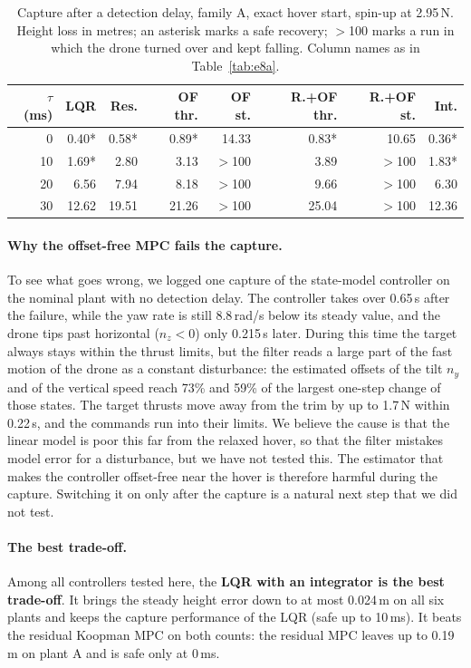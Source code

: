 \begin{table}[H]
\centering\footnotesize
\caption{Capture after a detection delay, family A, exact hover start, spin-up at 2.95\,N. Height loss in metres; an asterisk marks a safe recovery; $>$100 marks a run in which the drone turned over and kept falling. Column names as in Table~\ref{tab:e8a}.}\label{tab:e8a2}
\begin{tabular}{r r r r r r r r}
\toprule
$\tau$ (ms) & LQR & Res. & OF thr. & OF st. & R.+OF thr. & R.+OF st. & Int. \\
\midrule
0 & 0.40* & 0.58* & 0.89* & 14.33 & 0.83* & 10.65 & 0.36* \\
10 & 1.69* & 2.80 & 3.13 & $>$100 & 3.89 & $>$100 & 1.83* \\
20 & 6.56 & 7.94 & 8.18 & $>$100 & 9.66 & $>$100 & 6.30 \\
30 & 12.62 & 19.51 & 21.26 & $>$100 & 25.04 & $>$100 & 12.36 \\
\bottomrule
\end{tabular}
\end{table}

\paragraph{Why the offset-free MPC fails the capture.} To see what goes wrong, we logged one capture of the state-model controller on the nominal plant with no detection delay. The controller takes over 0.65\,s after the failure, while the yaw rate is still 8.8\,rad/s below its steady value, and the drone tips past horizontal ($n_z<0$) only 0.215\,s later. During this time the target always stays within the thrust limits, but the filter reads a large part of the fast motion of the drone as a constant disturbance: the estimated offsets of the tilt $n_y$ and of the vertical speed reach 73\% and 59\% of the largest one-step change of those states. The target thrusts move away from the trim by up to 1.7\,N within 0.22\,s, and the commands run into their limits. We believe the cause is that the linear model is poor this far from the relaxed hover, so that the filter mistakes model error for a disturbance, but we have not tested this. The estimator that makes the controller offset-free near the hover is therefore harmful during the capture. Switching it on only after the capture is a natural next step that we did not test.

\paragraph{The best trade-off.} Among all controllers tested here, the \textbf{LQR with an integrator is the best trade-off}. It brings the steady height error down to at most 0.024\,m on all six plants and keeps the capture performance of the LQR (safe up to 10\,ms). It beats the residual Koopman MPC on both counts: the residual MPC leaves up to 0.19\,m on plant A and is safe only at 0\,ms.

